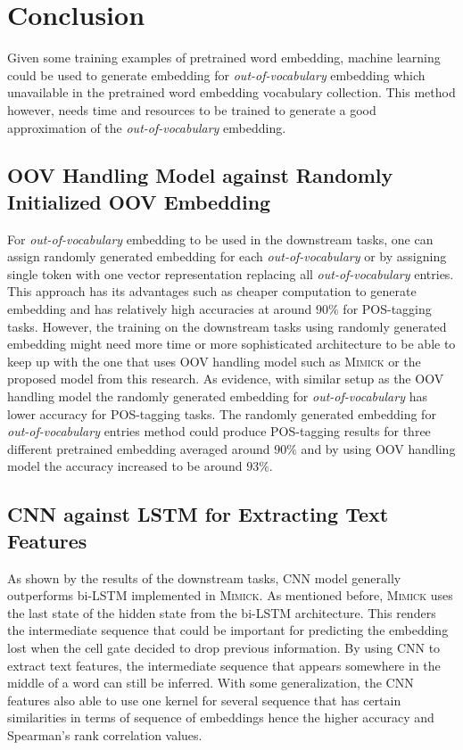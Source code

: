 \chapter{Conclusion}
\label{chap:conc}

Given some training examples of pretrained word embedding, machine
learning could be used to generate embedding for
\textit{out-of-vocabulary} embedding which unavailable in the
pretrained word embedding vocabulary collection. This method however,
needs time and resources to be trained to generate a good
approximation of the \textit{out-of-vocabulary} embedding.

\section{OOV Handling Model against Randomly Initialized OOV Embedding}
For \textit{out-of-vocabulary} embedding to be used in the downstream
tasks, one can assign randomly generated embedding for each
\textit{out-of-vocabulary} or by assigning single token with one
vector representation replacing all \textit{out-of-vocabulary}
entries. This approach has its advantages such as cheaper computation
to generate embedding and has relatively high accuracies at around
$90\%$ for POS-tagging tasks. However, the training on the downstream
tasks using randomly generated embedding might need more time or more
sophisticated architecture to be able to keep up with the one that
uses OOV handling model such as \textsc{Mimick} or the proposed model
from this research. As evidence, with similar setup as the OOV
handling model the randomly generated embedding for
\textit{out-of-vocabulary} has lower accuracy for POS-tagging tasks.
The randomly generated embedding for \textit{out-of-vocabulary}
entries method could produce POS-tagging results for three different
pretrained embedding averaged around $90\%$ and by using OOV handling
model the accuracy increased to be around $93\%$.

\section{CNN against LSTM for Extracting Text Features}
As shown by the results of the downstream tasks, CNN model generally
outperforms bi-LSTM implemented in \textsc{Mimick}. As mentioned before,
\textsc{Mimick} uses the last state of the hidden state from the
bi-LSTM architecture. This renders the intermediate sequence that
could be important for predicting the embedding lost when the cell
gate decided to drop previous information. By using CNN to extract
text features, the intermediate sequence that appears somewhere in the
middle of a word can still be inferred. With some generalization, the
CNN features also able to use one kernel for several sequence that has
certain similarities in terms of sequence of embeddings hence the
higher accuracy and Spearman's rank correlation values.

